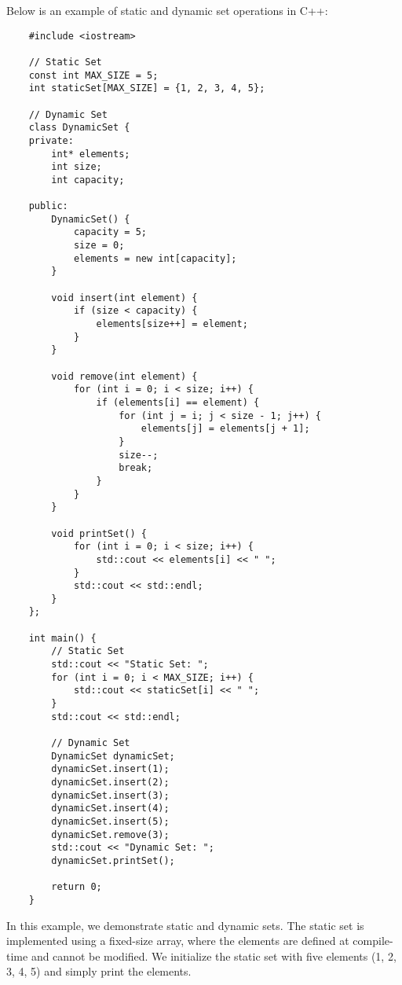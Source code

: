 \begin{solution}
    Below is an example of static and dynamic set operations in C++:

    \horizontalline

    \begin{verbatim}
    #include <iostream>

    // Static Set
    const int MAX_SIZE = 5;
    int staticSet[MAX_SIZE] = {1, 2, 3, 4, 5};
    
    // Dynamic Set
    class DynamicSet {
    private:
        int* elements;
        int size;
        int capacity;
    
    public:
        DynamicSet() {
            capacity = 5;
            size = 0;
            elements = new int[capacity];
        }
    
        void insert(int element) {
            if (size < capacity) {
                elements[size++] = element;
            }
        }
    
        void remove(int element) {
            for (int i = 0; i < size; i++) {
                if (elements[i] == element) {
                    for (int j = i; j < size - 1; j++) {
                        elements[j] = elements[j + 1];
                    }
                    size--;
                    break;
                }
            }
        }
    
        void printSet() {
            for (int i = 0; i < size; i++) {
                std::cout << elements[i] << " ";
            }
            std::cout << std::endl;
        }
    };
    
    int main() {
        // Static Set
        std::cout << "Static Set: ";
        for (int i = 0; i < MAX_SIZE; i++) {
            std::cout << staticSet[i] << " ";
        }
        std::cout << std::endl;
    
        // Dynamic Set
        DynamicSet dynamicSet;
        dynamicSet.insert(1);
        dynamicSet.insert(2);
        dynamicSet.insert(3);
        dynamicSet.insert(4);
        dynamicSet.insert(5);
        dynamicSet.remove(3);
        std::cout << "Dynamic Set: ";
        dynamicSet.printSet();
    
        return 0;
    }
    \end{verbatim}

    \horizontalline

    In this example, we demonstrate static and dynamic sets. The static set is implemented using a fixed-size array, where the elements are defined at compile-time and cannot be modified. We initialize the static set with five elements (1, 2, 3, 4, 5) and simply print the elements.


\end{solution}
